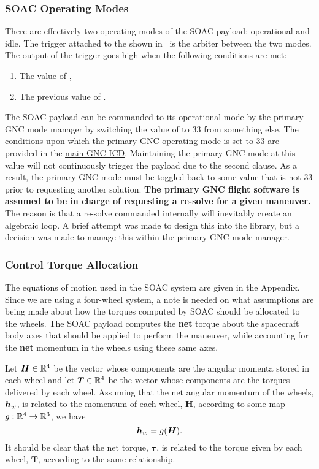 \documentclass[10pt]{article}
\begin{document}
\subsubsection{SOAC Operating Modes}\label{sec3:op_modes}
There are effectively two operating modes of the SOAC payload: operational and idle. The trigger attached to the  shown in~ is the arbiter between the two modes. The output of the trigger goes high when the following conditions are met:
\begin{enumerate}
\item The value of ,
\item The previous value of .
\end{enumerate}
The SOAC payload can be commanded to its operational mode by the primary GNC mode manager by switching the value of  to $33$ from something else. The conditions upon which the primary GNC operating mode is set to $33$ are provided in the \href{https://drive.google.com/open?id=1wTjmsQdXGk9jmEHy59fZAdBJJ3r1IE4LGFjHT2S5png}{main GNC ICD}. Maintaining the primary GNC mode at this value will not continuously trigger the payload due to the second clause. As a result, the primary GNC mode must be toggled back to some value that is not $33$ prior to requesting another solution. \textbf{The primary GNC flight software is assumed to be in charge of requesting a re-solve for a given maneuver.} The reason is that a re-solve commanded internally will inevitably create an algebraic loop. A brief attempt was made to design this into the library, but a decision was made to manage this within the primary GNC mode manager. 

\subsubsection{Control Torque Allocation}\label{sec3:allocation}

The equations of motion used in the SOAC system are given in the Appendix. Since we are using a four-wheel system, a note is needed on what assumptions are being made about how the torques computed by SOAC should be allocated to the wheels. The SOAC payload computes the \textbf{net} torque about the spacecraft body axes that should be applied to perform the maneuver, while accounting for the \textbf{net} momentum in the wheels using these same axes. 

Let $\bm{H}\in{\mathbb{R}}^4$ be the vector whose components are the angular momenta stored in each wheel and let $\bm{T}\in{\mathbb{R}}^4$ be the vector whose components are the torques delivered by each wheel. Assuming that the net angular momentum of the wheels, $\bm{h}_w$, is related to the momentum of each wheel, $\bm{H}$, according to some map $g : {\mathbb{R}}^4 \rightarrow {\mathbb{R}}^3$, we have
\begin{equation}
\bm{h}_w = g(\bm{H}).
\end{equation}
It should be clear that the net torque, $\bm{\tau}$, is related to the torque given by each wheel, $\bm{T}$, according to the same relationship. 
\end{document}
